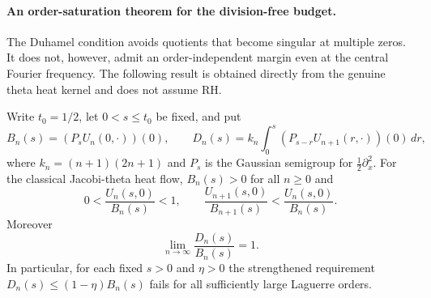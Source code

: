 
\paragraph{An order-saturation theorem for the division-free budget.}
The Duhamel condition avoids quotients that become
singular at multiple zeros. It does not, however,
admit an order-independent margin even at the
central Fourier frequency. The following result
is obtained directly from the genuine theta
heat kernel and does not assume RH.

\begin{theorem}
\label{thm:duhamelsaturation}
Write $t_0=1/2$, let $0<s\le t_0$ be fixed, and put
\[
B_n(s)=(P_sU_n(0,\cdot))(0),\qquad
D_n(s)=k_n\int_0^s
(P_{s-r}U_{n+1}(r,\cdot))(0)\,dr,
\]
where $k_n=(n+1)(2n+1)$ and $P_s$
is the Gaussian semigroup for
$\frac12\partial_x^2$.
For the classical Jacobi-theta heat flow,
$B_n(s)>0$ for all $n\ge0$ and
\begin{equation}\label{eq:duhamelcentralratio}
0<\frac{U_n(s,0)}{B_n(s)}<1,\qquad
\frac{U_{n+1}(s,0)}{B_{n+1}(s)}
<
\frac{U_n(s,0)}{B_n(s)}.
\end{equation}
Moreover
\begin{equation}\label{eq:duhamelsaturation}
\boxed{\lim_{n\to\infty}
\frac{D_n(s)}{B_n(s)}=1.}
\end{equation}
In particular, for each fixed $s>0$ and
$\eta>0$ the strengthened requirement
$D_n(s)\le(1-\eta)B_n(s)$ fails for
all sufficiently large Laguerre orders.
\end{theorem}

